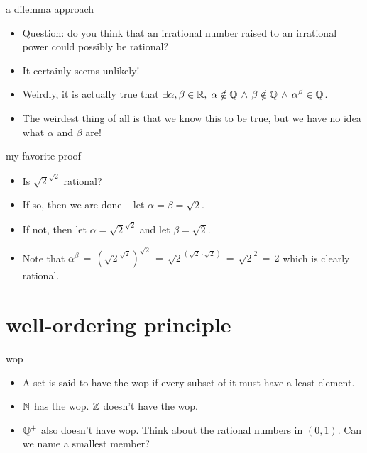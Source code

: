 \documentclass[landscape]{beamer}
\begin{document}
\begin{frame}{a dilemma approach}
\begin{itemize}
\item Question: do you think that an irrational number raised to an irrational power could possibly be rational? \pause
\item It certainly seems unlikely! \pause
\item Weirdly, it is actually true that $\displaystyle \exists \alpha, \beta \in {\mathbb R}, \; \alpha \notin {\mathbb Q} \, \land \, \beta \notin {\mathbb Q} \, \land \, \alpha^\beta \in {\mathbb Q}$. \pause
\item The weirdest thing of all is that we know this to be true, but we have no idea what $\alpha$ and $\beta$ are!
\end{itemize}
\end{frame}

\begin{frame}{my favorite proof}
\begin{itemize}
\item Is $\sqrt{2}^{\sqrt{2}}$ rational? \pause
\item If so, then we are done -- let $\alpha = \beta = \sqrt{2}$. \pause
\item If not, then let $\alpha = \sqrt{2}^{\sqrt{2}}$ and let $\beta = \sqrt{2}$. \pause
\item Note that $\alpha^\beta \, = \, \left( \sqrt{2}^{\sqrt{2}} \right)^{\sqrt{2}}  \, = \, \sqrt{2}^{\left(\sqrt{2}\cdot \sqrt{2}\right)} \, = \, \sqrt{2}^2 \, = \, 2$ which is clearly rational.
\end{itemize}
\end{frame}

\section{well-ordering principle}

\begin{frame}{wop}
\begin{itemize}
\item A set is said to have the wop if every subset of it must have a least element. \pause
\item ${\mathbb N}$ has the wop. \pause ${\mathbb Z}$ doesn't have the wop. \pause 
\item ${\mathbb Q}^+$ also doesn't have wop.  \pause Think about the rational numbers in $(0,1)$. \pause Can we name a smallest member?
\end{itemize}
\end{frame}
\end{document}
